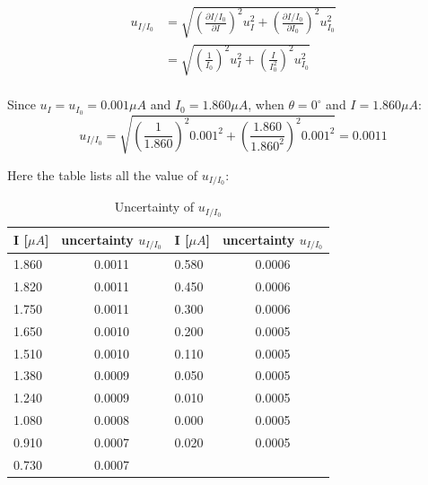 \documentclass[12pt, a4paper]{article}
\begin{document}
\begin{align*}
	u_{I/I_0}&=\sqrt{\left(\frac{\partial I/I_0}{\partial I}\right)^2u_{I}^2+\left(\frac{\partial I/I_0}{\partial I_0}\right)^2u_{I_0}^2}\\
	&=\sqrt{\left(\frac{1}{I_0}\right)^2u_{I}^2+\left(\frac{I}{I_0^2}\right)^2u_{I_0}^2}\\
\end{align*}

Since $u_I = u_{I_0} = 0.001 \mu A$ and $I_0 = 1.860 \mu A$, when $\theta = 0^{\circ}$ and $I = 1.860 \mu A$:
$$
	u_{I/I_0} = \sqrt{\left(\frac{1}{1.860}\right)^2 0.001^2+\left(\frac{1.860}{1.860^2}\right)^2 0.001^2} = 0.0011
$$

Here the table lists all the value of $u_{I/I_0}$:

\begin{table}[H]
	\centering
	\begin{tabular}{|l|cl|l|cl|}
	\hline
	I {[}$\mu A${]} & \multicolumn{2}{c|}{uncertainty   $u_{I/I_0}$} & I {[}$\mu A${]} & \multicolumn{2}{c|}{uncertainty $u_{I/I_0}$} \\ \hline
	1.860      & \multicolumn{2}{c|}{0.0011}                    & 0.580      & \multicolumn{2}{c|}{0.0006}                  \\ \hline
	1.820      & \multicolumn{2}{c|}{0.0011}                    & 0.450      & \multicolumn{2}{c|}{0.0006}                  \\ \hline
	1.750      & \multicolumn{2}{c|}{0.0011}                    & 0.300      & \multicolumn{2}{c|}{0.0006}                  \\ \hline
	1.650      & \multicolumn{2}{c|}{0.0010}                    & 0.200      & \multicolumn{2}{c|}{0.0005}                  \\ \hline
	1.510      & \multicolumn{2}{c|}{0.0010}                    & 0.110      & \multicolumn{2}{c|}{0.0005}                  \\ \hline
	1.380      & \multicolumn{2}{c|}{0.0009}                    & 0.050      & \multicolumn{2}{c|}{0.0005}                  \\ \hline
	1.240      & \multicolumn{2}{c|}{0.0009}                    & 0.010      & \multicolumn{2}{c|}{0.0005}                  \\ \hline
	1.080      & \multicolumn{2}{c|}{0.0008}                    & 0.000      & \multicolumn{2}{c|}{0.0005}                  \\ \hline
	0.910      & \multicolumn{2}{c|}{0.0007}                    & 0.020      & \multicolumn{2}{c|}{0.0005}                  \\ \hline
	0.730      & \multicolumn{2}{c|}{0.0007}                    &            & \multicolumn{2}{c|}{}                        \\ \hline
	\end{tabular}
	\caption{Uncertainty of $u_{I/I_0}$}
	\label{tab-2}
	\end{table}
\end{document}
